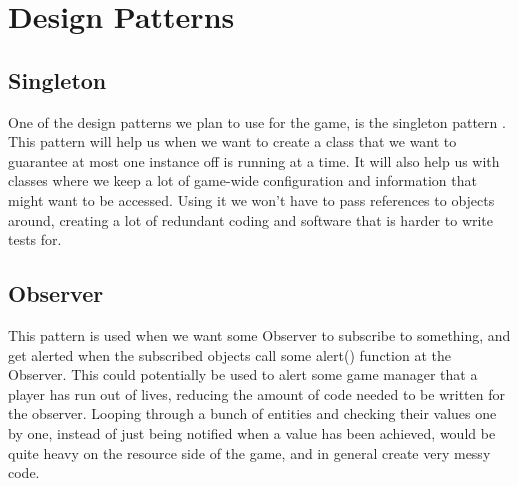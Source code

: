 \section{Design Patterns}

\subsection{Singleton}
One of the design patterns we plan to use for the game, is the singleton pattern \cite{wiki:singleton}. This pattern will help us when we want to create a class that we want to guarantee at most one instance off is running at a time. It will also help us with classes where we keep a lot of game-wide configuration and information that might want to be accessed. Using it we won't have to pass references to objects around, creating a lot of redundant coding and software that is harder to write tests for.

\subsection{Observer}
This pattern is used when we want some Observer \cite{wiki:observer} to subscribe to something, and get alerted when the subscribed objects call some alert() function at the Observer. This could potentially be used to alert some game manager that a player has run out of lives, reducing the amount of code needed to be written for the observer. Looping through a bunch of entities and checking their values one by one, instead of just being notified when a value has been achieved, would be quite heavy on the resource side of the game, and in general create very messy code.